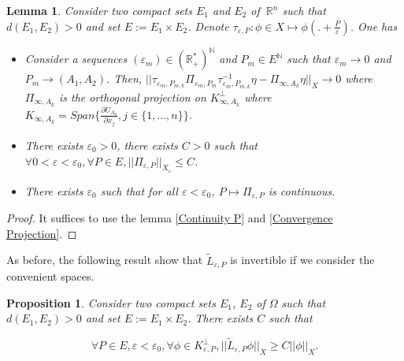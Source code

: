 \documentclass[12pt]{amsart}
\theoremstyle{plain}
\newtheorem{lemma}[theorem]{Lemma}       %
\newtheorem{proposition}[theorem]{Proposition}
\theoremstyle{definition}
\theoremstyle{remark}
\renewcommand{\epsilon}{\varepsilon}
\begin{document}
\begin{lemma}

Consider two compact sets $E_1$ and $E_2$  of $~\mathbb{R}^{n}$ such that $d(E_1,E_2)>0$ and set $E:=E_1\times E_2$. 
Denote $\tau_{\epsilon,P}:\phi \in X\mapsto \phi(. +\frac{P}{\epsilon}) $. One has
\begin{itemize}
   
    \item Consider a sequences $(\epsilon_m)\in (\mathbb{R}_+^*)^\mathbb{N}$ and $P_m \in E^\mathbb{N}$ such that $\epsilon_m \rightarrow 0$ and $P_m \rightarrow (A_1,A_2)$. Then, $||\tau_{\epsilon_m,P_{m,k}}\Pi_{\epsilon_m,P_m}\tau_{\epsilon_m,P_{m,k}}^{-1}\eta - \Pi_{\infty,A_k}\eta||_X\rightarrow0$  where $\Pi_{\infty,A_k}$ is the orthogonal projection on $ K_{\infty,A_k}^{\perp}$ where  $K_{\infty,A_k}=Span\{\frac{\partial U_{A_k}}{\partial x_j},j\in\{1,...,n\}\}$.
     \item There exists $\epsilon_0 >0$, there exists $C>0$ such that $\forall 0<\epsilon <\epsilon_0,\forall P\in E, ||\Pi_{\epsilon,P}||_{X_{\epsilon}}\leq C$. 
    \item There exists $\epsilon_0$ such that for all $\epsilon <\epsilon_0$, $P \mapsto \Pi_{\epsilon,P}$ is continuous.
    
    \end{itemize}



\end{lemma}
\begin{proof}
It suffices to use the lemma \ref{Continuity P} and \ref{Convergence Projection}.
\end{proof}
As before, the following result show that $\tilde{L}_{\epsilon,P}$ is invertible if we consider the convenient spaces. 
\begin{proposition}
    
Consider two compact sets $E_1$, $E_2$ of $\Omega$  such that $d(E_1,E_2)>0$ and set $E:=E_1\times E_2$. There exists $C$ such that

$$\forall P\in E, \epsilon <\epsilon_0,\forall\phi \in K_{\epsilon,P}^\perp, ||\tilde{L}_{\epsilon,P} \phi||_X \geq C||\phi||_X.$$


\end{proposition}
\end{document}
